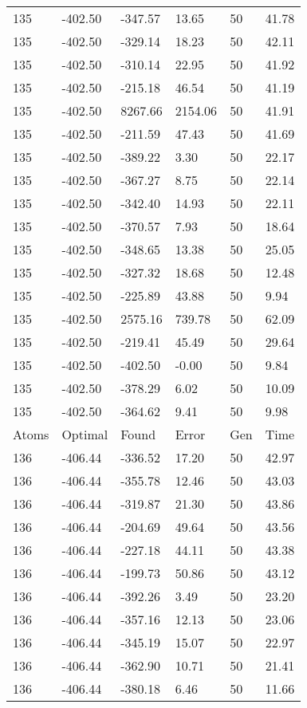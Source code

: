 \documentclass{report}
\begin{document}
\begin{appendix}
\begin{longtable}{llllll}
135 & -402.50 & -347.57 & 13.65 & 50 & 41.78 \\
135 & -402.50 & -329.14 & 18.23 & 50 & 42.11 \\
135 & -402.50 & -310.14 & 22.95 & 50 & 41.92 \\
135 & -402.50 & -215.18 & 46.54 & 50 & 41.19 \\
135 & -402.50 & 8267.66 & 2154.06 & 50 & 41.91 \\
135 & -402.50 & -211.59 & 47.43 & 50 & 41.69 \\
135 & -402.50 & -389.22 & 3.30 & 50 & 22.17 \\
135 & -402.50 & -367.27 & 8.75 & 50 & 22.14 \\
135 & -402.50 & -342.40 & 14.93 & 50 & 22.11 \\
135 & -402.50 & -370.57 & 7.93 & 50 & 18.64 \\
135 & -402.50 & -348.65 & 13.38 & 50 & 25.05 \\
135 & -402.50 & -327.32 & 18.68 & 50 & 12.48 \\
135 & -402.50 & -225.89 & 43.88 & 50 & 9.94 \\
135 & -402.50 & 2575.16 & 739.78 & 50 & 62.09 \\
135 & -402.50 & -219.41 & 45.49 & 50 & 29.64 \\
135 & -402.50 & -402.50 & -0.00 & 50 & 9.84 \\
135 & -402.50 & -378.29 & 6.02 & 50 & 10.09 \\
135 & -402.50 & -364.62 & 9.41 & 50 & 9.98 \\
Atoms & Optimal & Found & Error & Gen & Time \\
136 & -406.44 & -336.52 & 17.20 & 50 & 42.97 \\
136 & -406.44 & -355.78 & 12.46 & 50 & 43.03 \\
136 & -406.44 & -319.87 & 21.30 & 50 & 43.86 \\
136 & -406.44 & -204.69 & 49.64 & 50 & 43.56 \\
136 & -406.44 & -227.18 & 44.11 & 50 & 43.38 \\
136 & -406.44 & -199.73 & 50.86 & 50 & 43.12 \\
136 & -406.44 & -392.26 & 3.49 & 50 & 23.20 \\
136 & -406.44 & -357.16 & 12.13 & 50 & 23.06 \\
136 & -406.44 & -345.19 & 15.07 & 50 & 22.97 \\
136 & -406.44 & -362.90 & 10.71 & 50 & 21.41 \\
136 & -406.44 & -380.18 & 6.46 & 50 & 11.66 \\

\end{longtable}
\end{appendix}
\end{document}
